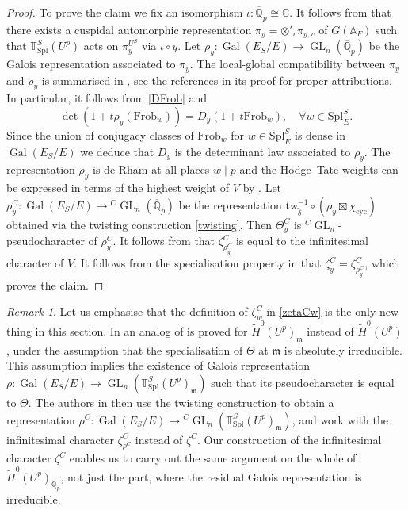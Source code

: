 \documentclass{amsart}
\theoremstyle{definition}
\theoremstyle{remark}
\newtheorem{remar}[prop]{Remark}
\DeclareMathOperator{\GL}{GL}
\DeclareMathOperator{\Gal}{Gal}
\newcommand{\Qp}{\mathbb {Q}_p}
\newcommand{\Qpbar}{\overline{\mathbb{Q}}_p}
\newcommand{\mm}{\mathfrak m}
\newcommand{\Htilde}{\widetilde{H}^0}
\newcommand{\Frob}{\mathrm{Frob}}
\newcommand{\tw}{\mathrm{tw}}
\newcommand{\cyc}{\mathrm{cyc}}
\newcommand{\Spl}{\mathrm{Spl}}
\begin{document}
\begin{proof}
To prove the claim we fix an isomorphism $\iota: \Qpbar\cong \mathbb C$. It follows from \cite[Lemma 9.18]{DPS} that there exists a cuspidal 
automorphic representation $\pi_y = \otimes'_v \pi_{y, v}$ of $G(\mathbb A_F)$ 
such that $ \mathbb T^S_{\Spl}(U^p)$ acts on 
$\pi_y^{U^S}$ via $\iota\circ y$. Let 
$\rho_y: \Gal(E_S/E)\rightarrow \GL_n(\Qpbar)$ 
be the Galois representation associated to $\pi_y$.
The local-global compatibility
between $\pi_{y}$ and $\rho_y$ is summarised in \cite[Theorem 7.2.1]{EGH}, 
see the references in its proof for proper attributions. In particular, it follows from 
\eqref{DFrob} and \cite[Theorem 7.2.1 (iii)]{EGH}
$$\det(1 + t \rho_y(\Frob_w))= D_y(1+ t \Frob_w), \quad \forall w\in \Spl_E^S.$$ 
Since the union of conjugacy classes of $\Frob_w$ for $w\in \Spl_E^S$ is dense in 
$\Gal(E_S/E)$ we deduce that $D_y$ is the 
determinant law associated to $\rho_y$. 
The representation $\rho_y$ is de Rham 
at all places $w\mid p$ and the Hodge--Tate 
weights can be expressed in terms of the 
highest weight of $V$ by \cite[Theorem 7.2.1 (ii)]{EGH}. Let $\rho^C_y: \Gal(E_S/E)\rightarrow {}^C\GL_n(\Qpbar)$ be
the representation $\tw_{\tilde{\delta}}^{-1}\circ(\rho_y\boxtimes \chi_{\cyc})$ obtained via the twisting construction \eqref{twisting}. 
Then $\Theta^C_y$ is ${}^C\GL_n$-pseudocharacter of $\rho^C_y$.
It follows from \cite[Proposition 5.5]{DPS} that $\zeta^C_{\rho^C_y}$ is equal to the 
infinitesimal character of $V$. It follows from the specialisation property in  that $\zeta^C_y=
\zeta^C_{\rho^C_y}$, which proves the claim.
\end{proof} 


\begin{remar}\label{explain} Let us emphasise that the definition  
of $\zeta^C_{w}$ in \eqref{zetaCw} is the only new thing in this section. 
In \cite{DPS} an analog of 
  is 
proved for $\Htilde(U^p)_{\mm}$ instead 
of $\Htilde(U^p)$, under the assumption that 
the specialisation of $\Theta$ at $\mm$ is absolutely irreducible. 
This assumption implies the existence of Galois representation
$\rho: \Gal(E_S/E)\rightarrow \GL_n(\mathbb T^S_{\Spl}(U^p)_{\mm})$
such that its pseudocharacter is equal to $\Theta$. The authors 
in \cite{DPS} then use the twisting construction to 
obtain a representation $\rho^C: \Gal(E_S/E)\rightarrow {}^C\GL_n(\mathbb T^S_{\Spl}(U^p)_{\mm})$, and 
work with the infinitesimal character $\zeta^C_{\rho^C}$ instead of 
$\zeta^C$. Our construction of the infinitesimal character $\zeta^C$ enables us to carry 
out the same argument on the 
whole of $\Htilde(U^{p})_{\Qp}$, not just the part, where the residual Galois representation is irreducible.
\end{remar} 




\end{document}
